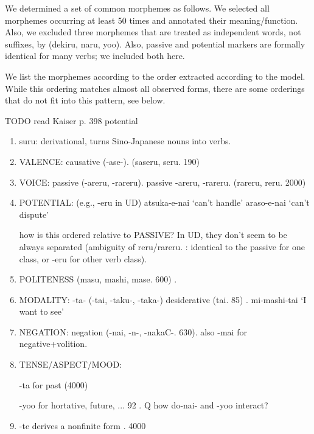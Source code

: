 We determined a set of common morphemes as follows.
We selected all morphemes occurring at least 50 times and annotated their meaning/function.
Also, we excluded three morphemes that are treated as independent words, not suffixes, by \cite{kaiser2013japanese} (dekiru, naru, yoo).
Also, passive and potential markers are formally identical for many verbs; we included both here.

We list the morphemes according to the order extracted according to the model.
While this ordering matches almost all observed forms, there are some orderings that do not fit into this pattern, see below.



TODO read Kaiser p. 398 potential

\begin{enumerate}
\item suru: derivational, turns Sino-Japanese nouns into verbs.
\item VALENCE: causative (-ase-). \cite[142]{hasegawa2014japanese} \cite[Chapter 13]{kaiser2013japanese} (saseru, seru. 190)
\item VOICE: passive (-areru, -rareru). passive \cite[152]{hasegawa2014japanese} \cite[Chapter 12]{kaiser2013japanese} -areru, -rareru. (rareru, reru. 2000)
\item POTENTIAL: (e.g., -eru in UD)  atsuka-e-nai `can't handle' %
araso-e-nai `can't dispute' %

how is this ordered relative to PASSIVE? In UD, they don't seem to be always separated (ambiguity of reru/rareru. \cite[346]{vaccari1938complete}: identical to the passive for one class, or -eru for other verb class).
\item POLITENESS (masu, mashi, mase. 600) \cite[190]{kaiser2013japanese}. %
\item MODALITY: -ta- (-tai, -taku-, -taka-) desiderative (tai. 85) \cite[238]{kaiser2013japanese}. mi-mashi-tai `I want to see'
\item NEGATION: negation (-nai, -n-, -nakaC-. 630). also -mai for negative+volition.
\item TENSE/ASPECT/MOOD:

-ta for past (4000)

-yoo for hortative, future, ... 92 \cite[229]{kaiser2013japanese}. Q how do-nai- and -yoo interact?
\item -te derives a nonfinite form \cite[186]{kaiser2013japanese}. 4000
\end{enumerate}

